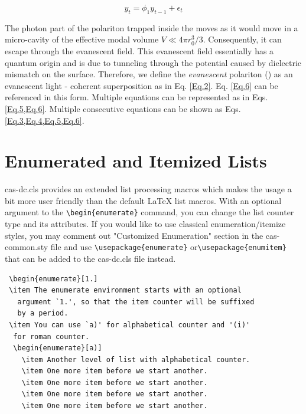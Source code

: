 \documentclass[a4paper,fleqn]{cas-dc}
\begin{document}
\begin{equation}
y_{t} = \phi_{1} y_{t-1} + \epsilon_{t}
\label{Eq.6}
\end{equation}
\begin{pot}
	The photon part of the polariton trapped inside the \PMS moves as
	it would move in a micro-cavity of the effective modal volume $V
	\ll 4 \pi r_{0}^{3} /3$. Consequently, it can escape through the
	evanescent field. This evanescent field essentially has a quantum
	origin and is due to tunneling through the potential caused by
	dielectric mismatch on the \PMS surface. Therefore, we define the
	\emph{evanescent} polariton (\EP) as an evanescent light - \QE
	coherent superposition as in Eq. \eqref{Eq.2}. Eq. \eqref{Eq.6} can be referenced in this form. Multiple equations can be represented as in Eqs. \eqref{Eq.5,Eq.6}. Multiple consecutive equations can be shown as Eqs. \eqref{Eq.3,Eq.4,Eq.5,Eq.6}.
\end{pot}

\section{Enumerated and Itemized Lists} %
{cas-dc.cls} provides an extended list processing macros
which makes the usage a bit more user friendly than the default
\LaTeX{} list macros. With an optional argument to the
\verb+\begin{enumerate}+ command, you can change the list counter
type and its attributes. If you would like to use classical enumeration/itemize styles,
you may comment out "Customized Enumeration" section in the cas-common.sty file
and use \verb+\usepackage{enumerate}+ or\linebreak \verb+\usepackage{enumitem}+ that can be added to the cas-dc.cls file instead.

\begin{verbatim}
 \begin{enumerate}[1.]
 \item The enumerate environment starts with an optional
   argument `1.', so that the item counter will be suffixed
   by a period.
 \item You can use `a)' for alphabetical counter and '(i)' 
  for roman counter.
  \begin{enumerate}[a)]
    \item Another level of list with alphabetical counter.
    \item One more item before we start another.
    \item One more item before we start another.
    \item One more item before we start another.
    \item One more item before we start another.
\end{verbatim}
\end{document}
